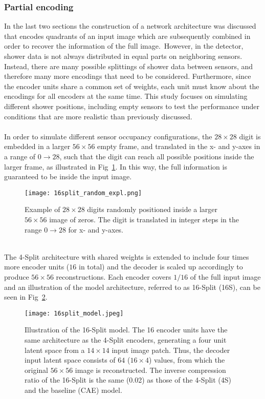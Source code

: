 \documentclass[../../main.tex]{subfiles}
\begin{document}
\subsubsection{Partial encoding}\label{sec:part_enc}
In the last two sections the construction of a network architecture was discussed that encodes quadrants of an input image which are subsequently combined in order to recover the information of the full image.~However, in the detector, shower data is not always distributed in equal parts on neighboring sensors. Instead, there are many possible splittings of shower data between sensors, and therefore many more encodings that need to be considered. Furthermore, since the encoder units share a common set of weights, each unit must know about the encodings for all encoders at the same time. This study focuses on simulating different shower positions, including empty sensors to test the performance under conditions that are more realistic than previously discussed.\\
\\
In order to simulate different sensor occupancy configurations, the $28\times28$ digit is embedded in a larger $56\times56$ empty frame, and translated in the x- and y-axes in a range of $0\rightarrow28$, such that the digit can reach all possible positions inside the larger frame, as illustrated in Fig~\ref{fig:rand_pos}. In this way, the full information is guaranteed to be inside the input image.\\
\begin{figure}[htp]
			\begin{center}
				\texttt{[image: 16split\_random\_expl.png]}
				\caption{Example of $28\times28$ digits randomly positioned inside a larger $56\times56$ image of zeros. The digit is translated in integer steps in the range $0\rightarrow28$ for x- and y-axes.}
				\label{fig:rand_pos}
			\end{center}
\end{figure}
\\
The 4-Split architecture with shared weights is extended to include four times more encoder units ($16$ in total) and the decoder is scaled up accordingly to produce $56\times56$ reconstructions. Each encoder covers $1/16$ of the full input image and an illustration of the model architecture, referred to as 16-Split (16S), can be seen in Fig~\ref{fig:16s}.\\
\begin{figure}[htp]
			\begin{center}
				\texttt{[image: 16split\_model.jpeg]}
				\caption{Illustration of the 16-Split model. The 16 encoder units have the same architecture as the 4-Split encoders, generating a four unit latent space from a $14\times14$ input image patch. Thus, the decoder input latent space consists of $64$ ($16\times4$) values, from which the original $56\times56$ image is reconstructed. The inverse compression ratio of the 16-Split is the same (0.02) as those of the 4-Split (4S) and the baseline (CAE) model.}
				\label{fig:16s}
			\end{center}
\end{figure}
\end{document}
